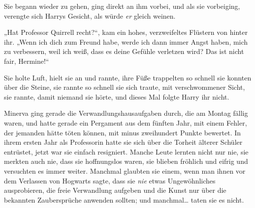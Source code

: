 Sie begann wieder zu gehen, ging direkt an ihm vorbei, und als sie vorbeiging, verengte sich Harrys Gesicht, als würde \emph{er} gleich weinen.

„Hat Professor Quirrell recht?“, kam ein hohes, verzweifeltes Flüstern von hinter ihr. „Wenn ich dich zum Freund habe, werde ich dann immer Angst haben, mich zu verbessern, weil ich weiß, dass es deine Gefühle verletzen wird? Das ist nicht fair, Hermine!“

Sie holte Luft, hielt sie an und rannte, ihre Füße trappelten so schnell sie konnten über die Steine, sie rannte so schnell sie sich traute, mit verschwommener Sicht, sie rannte, damit niemand sie hörte, und dieses Mal folgte Harry ihr nicht.

\later

Minerva ging gerade die Verwandlungshausaufgaben durch, die am Montag fällig waren, und hatte gerade ein Pergament aus dem fünften Jahr, mit einem Fehler, der jemanden hätte töten können, mit minus zweihundert Punkte bewertet. In ihrem ersten Jahr als Professorin hatte sie sich über die Torheit älterer Schüler entrüstet, jetzt war sie einfach resigniert. Manche Leute lernten nicht nur nie, sie merkten auch nie, dass sie hoffnungslos waren, sie blieben fröhlich und eifrig und versuchten es immer weiter. Manchmal glaubten sie einem, wenn man ihnen vor dem Verlassen von Hogwarts sagte, dass sie \emph{nie} etwas Ungewöhnliches ausprobieren, die freie Verwandlung aufgeben und die Kunst nur über die bekannten Zaubersprüche anwenden sollten; und manchmal… taten sie es nicht.

